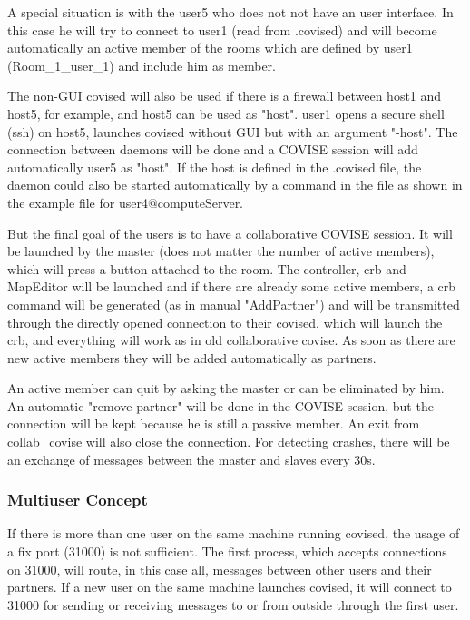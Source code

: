 A special situation is with the user5 who does not not have an user interface. 
In this case he will try to connect  to  user1 (read from .covised) and will 
become automatically an active member of the rooms which are defined by user1 
(Room\_1\_user\_1) and include him as member. 

The non-GUI covised will also be used if there is a firewall  between host1 and 
host5, for example, and host5 can be used as "host". user1 opens a secure 
shell (ssh) on host5, launches covised without GUI but with an argument "-host". 
The connection between daemons will be done and a COVISE session will add 
automatically user5 as "host". If the host is defined in the .covised file, the 
daemon could also be started automatically by a command in the file as shown in 
the example file for user4@computeServer.

But the final goal of the users is to have a collaborative COVISE session. It will 
be launched by the master (does not matter the number of active members), which will 
press a button attached to the room. The controller, crb and MapEditor will be 
launched and if there are already some active members, a crb command will be 
generated (as in manual "AddPartner") and will be transmitted through the directly 
opened connection to their covised, which will launch the crb, and everything will 
work as in old collaborative covise. As soon as there are new active members 
they will be added automatically as partners.

An active member can quit by asking the master or can be eliminated by him. 
An automatic "remove partner" will be done in the COVISE session, but the connection will 
be kept because he is still a passive member. An exit from collab\_covise will also close 
the connection. For detecting crashes,  there will be  an exchange 
of messages between the master and slaves every 30s.

\subsubsection{Multiuser Concept}   
 
If there is more than one user on the same machine running covised, the usage 
of a fix port (31000) is not sufficient. The first process, which accepts connections 
on 31000, will route, in this case all, messages between other users and their 
partners. If a new user on the same machine launches covised, it will connect to 
31000 for sending or receiving messages to or from outside through the first user.
 

